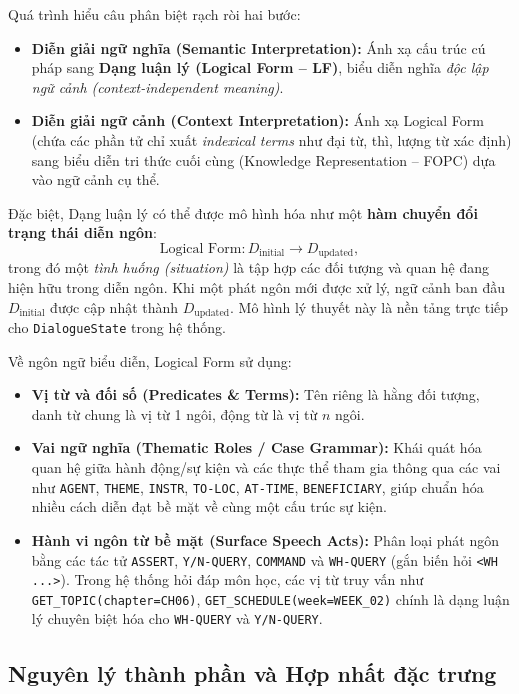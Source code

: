 Quá trình hiểu câu phân biệt rạch ròi hai bước:
\begin{itemize}
  \item \textbf{Diễn giải ngữ nghĩa (Semantic Interpretation):} Ánh xạ cấu trúc cú pháp sang \textbf{Dạng luận lý (Logical Form -- LF)}, biểu diễn nghĩa \emph{độc lập ngữ cảnh (context-independent meaning)}.
  \item \textbf{Diễn giải ngữ cảnh (Context Interpretation):} Ánh xạ Logical Form (chứa các phần tử chỉ xuất \emph{indexical terms} như đại từ, thì, lượng từ xác định) sang biểu diễn tri thức cuối cùng (Knowledge Representation -- FOPC) dựa vào ngữ cảnh cụ thể.
\end{itemize}

Đặc biệt, Dạng luận lý có thể được mô hình hóa như một \textbf{hàm chuyển đổi trạng thái diễn ngôn}:
\[
\text{Logical Form}: D_{\text{initial}} \longrightarrow D_{\text{updated}},
\]
trong đó một \emph{tình huống (situation)} là tập hợp các đối tượng và quan hệ đang hiện hữu trong diễn ngôn. Khi một phát ngôn mới được xử lý, ngữ cảnh ban đầu $D_{\text{initial}}$ được cập nhật thành $D_{\text{updated}}$. Mô hình lý thuyết này là nền tảng trực tiếp cho \texttt{DialogueState} trong hệ thống.

Về ngôn ngữ biểu diễn, Logical Form sử dụng:
\begin{itemize}
  \item \textbf{Vị từ và đối số (Predicates \& Terms):} Tên riêng là hằng đối tượng, danh từ chung là vị từ 1 ngôi, động từ là vị từ $n$ ngôi.
  \item \textbf{Vai ngữ nghĩa (Thematic Roles / Case Grammar):} Khái quát hóa quan hệ giữa hành động/sự kiện và các thực thể tham gia thông qua các vai như \texttt{AGENT}, \texttt{THEME}, \texttt{INSTR}, \texttt{TO-LOC}, \texttt{AT-TIME}, \texttt{BENEFICIARY}, giúp chuẩn hóa nhiều cách diễn đạt bề mặt về cùng một cấu trúc sự kiện.
  \item \textbf{Hành vi ngôn từ bề mặt (Surface Speech Acts):} Phân loại phát ngôn bằng các tác tử \texttt{ASSERT}, \texttt{Y/N-QUERY}, \texttt{COMMAND} và \texttt{WH-QUERY} (gắn biến hỏi \texttt{<WH ...>}). Trong hệ thống hỏi đáp môn học, các vị từ truy vấn như \texttt{GET\_TOPIC(chapter=CH06)}, \texttt{GET\_SCHEDULE(week=WEEK\_02)} chính là dạng luận lý chuyên biệt hóa cho \texttt{WH-QUERY} và \texttt{Y/N-QUERY}.
\end{itemize}

\subsection{Nguyên lý thành phần và Hợp nhất đặc trưng}

